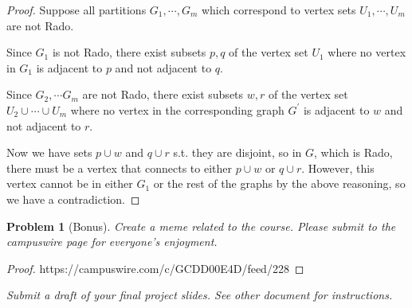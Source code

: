 \documentclass[11pt]{article}
\newtheorem{problem}{Problem}
\begin{document}
\begin{proof}
Suppose all partitions \(G_1, \cdots, G_m\) which correspond to vertex sets \(U_1,\cdots, U_m\) are not Rado.

Since \(G_1\) is not Rado, there exist subsets \(p, q\) of the vertex set \(U_1\) where no vertex in \(G_1\) is adjacent to \(p\) and not adjacent to \(q\).

Since \(G_2, \cdots G_m\) are not Rado, there exist subsets \(w, r\) of the vertex set \(U_2 \cup \cdots \cup U_m\) where no vertex in the corresponding graph \(G^\prime\) is adjacent to \(w\) and not adjacent to \(r\).

Now we have sets \(p \cup w\) and \(q \cup r\) s.t. they are disjoint, so in \(G\), which is Rado, there must be a vertex that connects to either \(p \cup w\) or \(q \cup r\). However, this vertex cannot be in either \(G_1\) or the rest of the graphs by the above reasoning, so we have a contradiction.
\end{proof}

\pagebreak


\begin{problem}[Bonus] Create a meme related to the course. Please submit to the campuswire page for everyone's enjoyment. 
\end{problem}
\begin{proof}
	https://campuswire.com/c/GCDD00E4D/feed/228
\end{proof}

\pagebreak
{\it Submit a draft of your final project slides. See other document for instructions.} 
\end{document}
